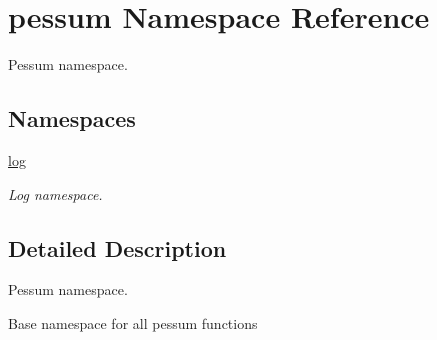 \hypertarget{namespacepessum}{}\section{pessum Namespace Reference}
\label{namespacepessum}


Pessum namespace.  


\subsection*{Namespaces}
\begin{DoxyCompactItemize}
\item 
 \hyperlink{namespacepessum_1_1log}{log}
\begin{DoxyCompactList}\small\item\em Log namespace. \end{DoxyCompactList}\end{DoxyCompactItemize}


\subsection{Detailed Description}
Pessum namespace. 

Base namespace for all pessum functions 